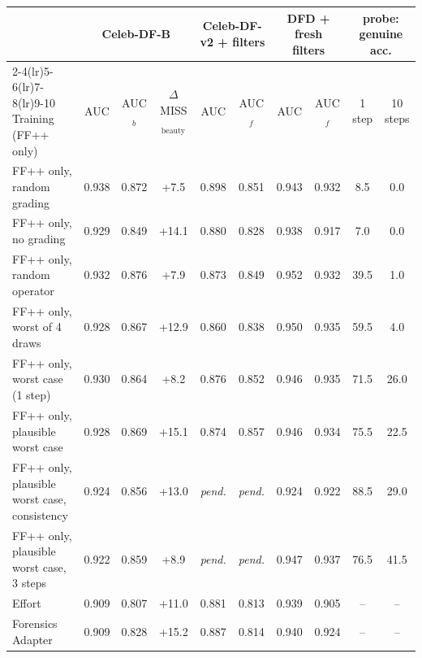 \begin{tabular}{@{}l ccc cc cc cc@{}}
\toprule
 & \multicolumn{3}{c}{Celeb-DF-B} & \multicolumn{2}{c}{Celeb-DF-v2 + filters} & \multicolumn{2}{c}{DFD + fresh filters} & \multicolumn{2}{c}{probe: genuine acc.} \\
\cmidrule(lr){2-4}\cmidrule(lr){5-6}\cmidrule(lr){7-8}\cmidrule(lr){9-10}
Training (FF++ only) & AUC & AUC$_b$ & $\Delta$MISS$_\text{beauty}$ & AUC & AUC$_f$ & AUC & AUC$_f$ & 1 step & 10 steps \\
\midrule
FF++ only, random grading & 0.938 & 0.872 & +7.5 & 0.898 & 0.851 & 0.943 & 0.932 & 8.5 & 0.0 \\
FF++ only, no grading & 0.929 & 0.849 & +14.1 & 0.880 & 0.828 & 0.938 & 0.917 & 7.0 & 0.0 \\
FF++ only, random operator & 0.932 & 0.876 & +7.9 & 0.873 & 0.849 & 0.952 & 0.932 & 39.5 & 1.0 \\
FF++ only, worst of 4 draws & 0.928 & 0.867 & +12.9 & 0.860 & 0.838 & 0.950 & 0.935 & 59.5 & 4.0 \\
FF++ only, worst case (1 step) & 0.930 & 0.864 & +8.2 & 0.876 & 0.852 & 0.946 & 0.935 & 71.5 & 26.0 \\
FF++ only, plausible worst case & 0.928 & 0.869 & +15.1 & 0.874 & 0.857 & 0.946 & 0.934 & 75.5 & 22.5 \\
FF++ only, plausible worst case, consistency & 0.924 & 0.856 & +13.0 & \textit{pend.} & \textit{pend.} & 0.924 & 0.922 & 88.5 & 29.0 \\
FF++ only, plausible worst case, 3 steps & 0.922 & 0.859 & +8.9 & \textit{pend.} & \textit{pend.} & 0.947 & 0.937 & 76.5 & 41.5 \\
\midrule
Effort~\cite{effort} & 0.909 & 0.807 & +11.0 & 0.881 & 0.813 & 0.939 & 0.905 & -- & -- \\
Forensics Adapter~\cite{forensicsadapter} & 0.909 & 0.828 & +15.2 & 0.887 & 0.814 & 0.940 & 0.924 & -- & -- \\
\bottomrule
\end{tabular}
